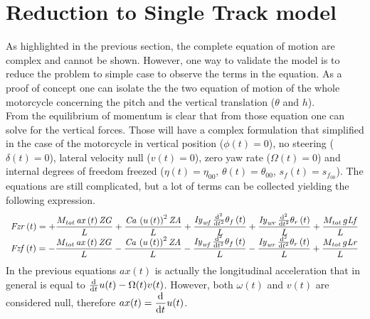 \section{Reduction to Single Track model}
%
As highlighted in the previous section, the complete equation of motion are complex and cannot be shown. However, one way to validate the model is to reduce the problem to simple case to observe the terms in the equation. As a proof of concept one can isolate the the two equation of motion of the whole motorcycle concerning the pitch and the vertical translation ($\theta$ and $h$).\\
%
%
From the equilibrium of momentum is clear that from those equation one can solve for the vertical forces. Those will have a complex formulation that simplified in the case of the motorcycle in vertical position ($\phi(t)=0$), no steering ($\delta(t)=0$), lateral velocity null ($v(t)=0$), zero yaw rate ($\Omega(t)=0$) and internal degrees of freedom freezed ($\eta(t)=\eta_{00}$, $\theta(t) = \theta_{00}$, $s_f(t)=s_{f_{00}}$). The equations are still complicated, but a lot of terms can be collected yielding the following expression.
%
\begin{equation}
    \label{eq:vertForces}
\begin{array}{c} 
\displaystyle
{\it Fzr} \left( t \right) =+{\frac {M_{{\it tot}}\,{\it ax} \left( t \right) {\it ZG}}{L}}+{\frac {{\it Ca}\,\left( u \left( t \right)  \right) ^{2}{\it ZA}}{L}}+{\frac {{\it Iy}_{{\it wf}}\,{\frac {{\rm d}^{2}}{{\rm d}{t}^{2}}}\theta_{f} \left( t \right) }{L}}+{\frac {{\it Iy}_{{\it wr}}\,{\frac {{\rm d}^{2}}{{\rm d}{t}^{2}}}\theta_{r} \left( t \right) }{L}}+{\frac {M_{{\it tot}}\,g{\it Lf}}{L}}\\
\displaystyle
{\it Fzf} \left( t \right) =-{\frac {M_{{\it tot}}\,{\it ax} \left( t \right) {\it ZG}}{L}}-{\frac {{\it Ca}\, \left( u \left( t \right)  \right) ^{2}{\it ZA}}{L}}-{\frac {{\it Iy}_{{\it wf}}\,{\frac {{\rm d}^{2}}{{\rm d}{t}^{2}}}\theta_{f} \left( t \right) }{L}}-{\frac {{\it Iy}_{{\it wr}}\,{\frac {{\rm d}^{2}}{{\rm d}{t}^{2}}}\theta_{r} \left( t \right) }{L}}+{\frac {M_{{\it tot}}\,g{\it Lr}}{L}}
\end{array}    
\end{equation}
%
In the previous equations $ax(t)$ is actually the longitudinal acceleration that in general is equal to $\frac {{\rm d}^{}}{{\rm d}{t}^{}}u(t)-\Omega(t) v(t)$. However, both $\omega(t)$ and $v(t)$ are considered null, therefore $\displaystyle ax(t) = \frac {{\rm d}^{}}{{\rm d}{t}^{}}u(t)$.
